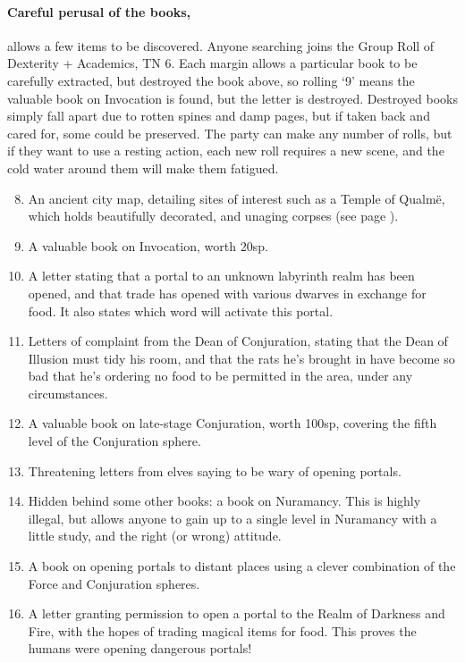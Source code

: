 \begin{multicols}{2}
\paragraph{Careful perusal of the books,}
allows a few items to be discovered.
Anyone searching joins the Group Roll of Dexterity + Academics, TN 6.
Each margin allows a particular book to be carefully extracted, but destroyed the book above, so rolling `9' means the valuable book on Invocation is found, but the letter is destroyed.
Destroyed books simply fall apart due to rotten spines and damp pages, but if taken back and cared for, some could be preserved.
The party can make any number of rolls, but if they want to use a resting action, each new roll requires a new scene, and the cold water around them will make them fatigued.

\begin{enumerate}

\setcounter{enumi}{7}
  \item
  An ancient city map, detailing sites of interest such as a Temple of Qualm\"{e}, which holds beautifully decorated, and unaging corpses (see page \pageref{green_tower}).
  \item
  A valuable book on Invocation, worth 20sp.
  \item
  A letter stating that a portal to an unknown labyrinth realm has been opened, and that trade has opened with various dwarves in exchange for food.  It also states which word will activate this portal.
  \item
  Letters of complaint from the Dean of Conjuration, stating that the Dean of Illusion must tidy his room, and that the rats he's brought in have become so bad that he's ordering no food to be permitted in the area, under any circumstances.
  \item
  A valuable book on late-stage Conjuration, worth 100sp, covering the fifth level of the Conjuration sphere.
  \item
  Threatening letters from elves saying to be wary of opening portals.
  \item
  Hidden behind some other books: a book on Nuramancy.  This is highly illegal, but allows anyone to gain up to a single level in Nuramancy with a little study, and the right (or wrong) attitude.
  \item
  A book on opening portals to distant places using a clever combination of the Force and Conjuration spheres.
  \item
  A letter granting permission to open a portal to the Realm of Darkness and Fire, with the hopes of trading magical items for food.
  This proves the humans were opening dangerous portals!


\end{enumerate}
\end{multicols}
